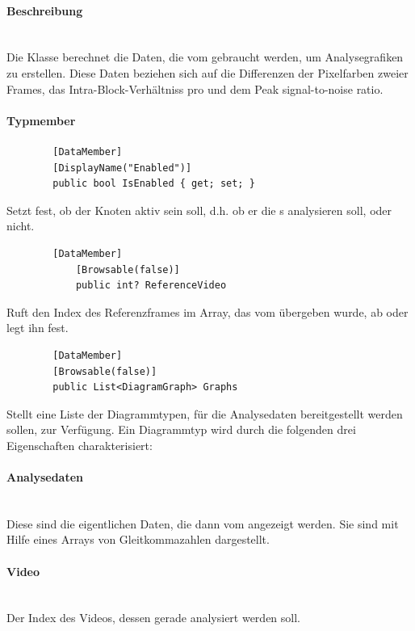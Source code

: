 \paragraph{Beschreibung}~\\
Die Klasse  berechnet die Daten, die vom  gebraucht werden, um Analysegrafiken zu erstellen. Diese Daten beziehen sich auf die Differenzen der Pixelfarben zweier Frames, das Intra-Block-Verhältniss pro  und dem Peak signal-to-noise ratio.

\paragraph{Typmember}
\begin{itemize}

	\begin{verbatim}
		[DataMember]
		[DisplayName("Enabled")]
		public bool IsEnabled { get; set; }
	\end{verbatim}
	Setzt fest, ob der Knoten aktiv sein soll, d.h. ob er die s analysieren soll, oder nicht.
	
	\begin{verbatim}
		[DataMember]
			[Browsable(false)]
			public int? ReferenceVideo
	\end{verbatim}
	Ruft den Index des Referenzframes im Array, das vom  übergeben wurde, ab oder legt ihn fest.

	\begin{verbatim}
		[DataMember]
		[Browsable(false)]
		public List<DiagramGraph> Graphs
	\end{verbatim}
	Stellt eine Liste der Diagrammtypen, für die Analysedaten bereitgestellt werden sollen, zur Verfügung. Ein Diagrammtyp wird durch die folgenden drei Eigenschaften charakterisiert:
	\paragraph{Analysedaten}~\\ Diese sind die eigentlichen Daten, die dann vom  angezeigt werden. Sie sind mit Hilfe eines Arrays von Gleitkommazahlen dargestellt.
	\paragraph{Video}~\\ Der Index des Videos, dessen  gerade analysiert werden soll.

\end{itemize}
